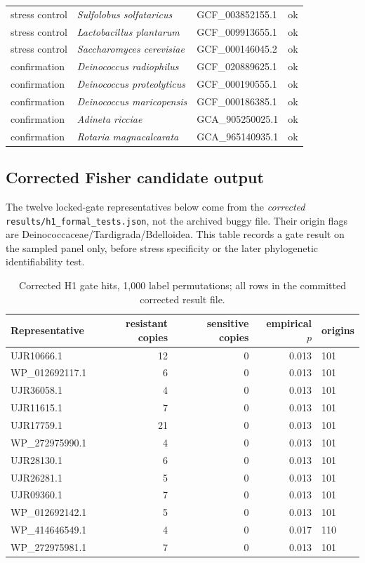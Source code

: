 \begin{table}[!htbp]
\begin{tabular}{p{2.2cm}p{5.0cm}p{3.3cm}l}
stress control & \emph{Sulfolobus solfataricus} & GCF\_003852155.1 & ok \\
stress control & \emph{Lactobacillus plantarum} & GCF\_009913655.1 & ok \\
stress control & \emph{Saccharomyces cerevisiae} & GCF\_000146045.2 & ok \\
confirmation & \emph{Deinococcus radiophilus} & GCF\_020889625.1 & ok \\
confirmation & \emph{Deinococcus proteolyticus} & GCF\_000190555.1 & ok \\
confirmation & \emph{Deinococcus maricopensis} & GCF\_000186385.1 & ok \\
confirmation & \emph{Adineta ricciae} & GCA\_905250025.1 & ok \\
confirmation & \emph{Rotaria magnacalcarata} & GCA\_965140935.1 & ok \\
\hline\end{tabular}\end{table}
\subsection{Corrected Fisher candidate output}
The twelve locked-gate representatives below come from the \emph{corrected} \texttt{results/h1\_formal\_tests.json}, not the archived buggy file. Their origin flags are Deinococcaceae/Tardigrada/Bdelloidea. This table records a gate result on the sampled panel only, before stress specificity or the later phylogenetic identifiability test.\begin{table}[!htbp]\centering\small\caption{Corrected H1 gate hits, 1,000 label permutations; all rows in the committed corrected result file.}\begin{tabular}{lrrrl}\hline Representative & resistant copies & sensitive copies & empirical $p$ & origins \\\hline
UJR10666.1 & 12 & 0 & 0.013 & 101 \\
WP\_012692117.1 & 6 & 0 & 0.013 & 101 \\
UJR36058.1 & 4 & 0 & 0.013 & 101 \\
UJR11615.1 & 7 & 0 & 0.013 & 101 \\
UJR17759.1 & 21 & 0 & 0.013 & 101 \\
WP\_272975990.1 & 4 & 0 & 0.013 & 101 \\
UJR28130.1 & 6 & 0 & 0.013 & 101 \\
UJR26281.1 & 5 & 0 & 0.013 & 101 \\
UJR09360.1 & 7 & 0 & 0.013 & 101 \\
WP\_012692142.1 & 5 & 0 & 0.013 & 101 \\
WP\_414646549.1 & 4 & 0 & 0.017 & 110 \\
WP\_272975981.1 & 7 & 0 & 0.013 & 101 \\
\hline\end{tabular}\end{table}
